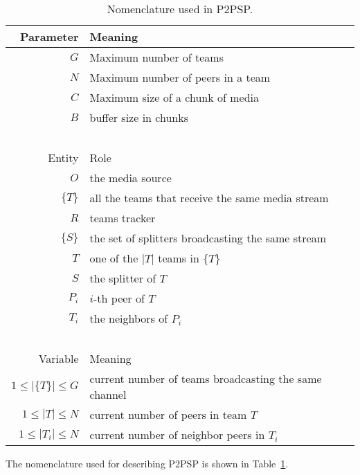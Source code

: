 \begin{table}
  \begin{tabular}{rl}
    Parameter & Meaning \\
    \hline
    $G$       & Maximum number of teams \\
    $N$       & Maximum number of peers in a team \\
    $C$       & Maximum size of a chunk of media \\
    $B$       & buffer size in chunks \\
    ~\\
    Entity  & Role \\
    \hline
    $O$     & the media source \\
    $\{T\}$ & all the teams that receive the same media stream \\
    $R$     & teams tracker \\
    $\{S\}$ & the set of splitters broadcasting the same stream \\
    $T$     & one of the $|T|$ teams in $\{T\}$ \\
    $S$     & the splitter of $T$ \\
    $P_i$   & $i$-th peer of $T$ \\
    $T_i$   & the neighbors of $P_i$ \\
    ~\\
    Variable            & Meaning \\
    \hline
    $1\leq |\{T\}|\leq G$ & current number of teams broadcasting the same channel \\
    $1\leq |T|\leq N$     & current number of peers in team $T$ \\
    $1\leq |T_i|\leq N$   & current number of neighbor peers in $T_i$ \\
  \end{tabular}
  \caption{Nomenclature used in P2PSP.\label{tab:P2PSP_nomenclature}}
\end{table}

The nomenclature used for describing P2PSP is shown in
Table~\ref{tab:P2PSP_nomenclature}.
